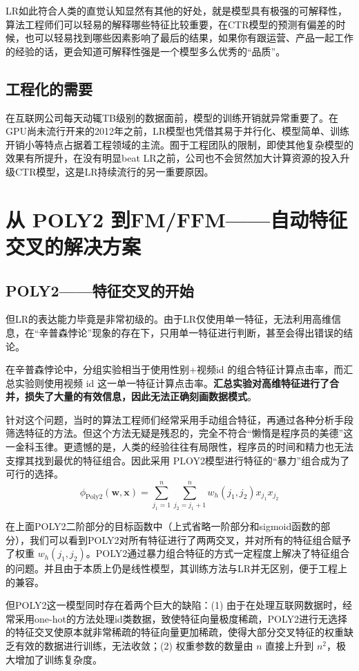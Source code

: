 \documentclass[12pt]{article}
\begin{document}
LR如此符合人类的直觉认知显然有其他的好处，就是模型具有极强的可解释性，算法工程师们可以轻易的解释哪些特征比较重要，在CTR模型的预测有偏差的时候，也可以轻易找到哪些因素影响了最后的结果，如果你有跟运营、产品一起工作的经验的话，更会知道可解释性强是一个模型多么优秀的“品质”。

\subsection{工程化的需要}
在互联网公司每天动辄TB级别的数据面前，模型的训练开销就异常重要了。在GPU尚未流行开来的2012年之前，LR模型也凭借其易于并行化、模型简单、训练开销小等特点占据着工程领域的主流。囿于工程团队的限制，即使其他复杂模型的效果有所提升，在没有明显beat LR之前，公司也不会贸然加大计算资源的投入升级CTR模型，这是LR持续流行的另一重要原因。

\section{从 POLY2 到FM/FFM——自动特征交叉的解决方案}
\subsection{POLY2——特征交叉的开始}
但LR的表达能力毕竟是非常初级的。由于LR仅使用单一特征，无法利用高维信息，在“辛普森悖论”现象的存在下，只用单一特征进行判断，甚至会得出错误的结论。

在辛普森悖论中，分组实验相当于使用性别+视频id 的组合特征计算点击率，而汇总实验则使用视频 id 这一单一特征计算点击率。\textbf{汇总实验对高维特征进行了合并，损失了大量的有效信息，因此无法正确刻画数据模式}。

针对这个问题，当时的算法工程师们经常采用手动组合特征，再通过各种分析手段筛选特征的方法。但这个方法无疑是残忍的，完全不符合“懒惰是程序员的美德”这一金科玉律。更遗憾的是，人类的经验往往有局限性，程序员的时间和精力也无法支撑其找到最优的特征组合。因此采用 PLOY2模型进行特征的“暴力”组合成为了可行的选择。
$$
\phi_{\text{Poly2}}(\mathbf{w}, \mathbf{x}) = \sum_{j_1=1}^n\sum_{j_2 = j_1 + 1}^n w_h(j_1, j_2)x_{j_1}x_{j_2}
$$

在上面POLY2二阶部分的目标函数中（上式省略一阶部分和sigmoid函数的部分），我们可以看到POLY2对所有特征进行了两两交叉，并对所有的特征组合赋予了权重 $w_h(j_1, j_2)$。POLY2通过暴力组合特征的方式一定程度上解决了特征组合的问题。并且由于本质上仍是线性模型，其训练方法与LR并无区别，便于工程上的兼容。

但POLY2这一模型同时存在着两个巨大的缺陷：(1) 由于在处理互联网数据时，经常采用one-hot的方法处理id类数据，致使特征向量极度稀疏，POLY2进行无选择的特征交叉使原本就非常稀疏的特征向量更加稀疏，使得大部分交叉特征的权重缺乏有效的数据进行训练，无法收敛；(2) 权重参数的数量由 $n$ 直接上升到 $n^2$，极大增加了训练复杂度。
\end{document}
